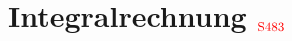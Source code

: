 \newcommand{\titleinfo}{Analysis 2E - Formelsammlung}
\newcommand{\authorinfo}{F. Braun, L. Schmid, U. Giger, R. Koller, E. Ammann, S.Arnold, C.Gwerder, S.Körner}
\newcommand{\versioninfo}{$Revision: 813 $ - powered by \LaTeX}


\newcommand{\formelbuch}[1]{$_{\textcolor{red}{\mbox{\small{S#1}}}}$}
\newcommand{\verweis}[2]{\small{(siehe auch \ref{#1}, #2 (S. \pageref{#1}))}}
\newcommand{\subsubadd}[1]{\textcolor{black}{\mbox{#1}}}



\setlength{\parindent}{0pt}
           
\section{Integralrechnung \formelbuch{483}}
